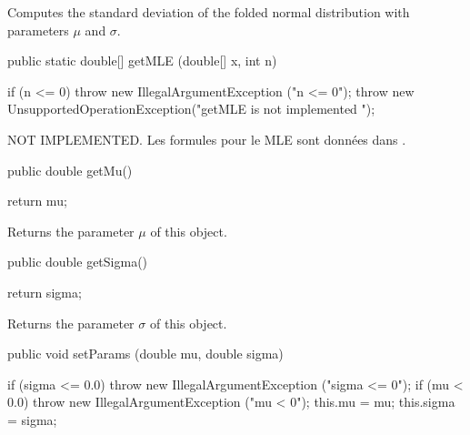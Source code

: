 \begin{tabb}  Computes the standard deviation of the folded normal distribution
with  parameters $\mu$ and $\sigma$.
\end{tabb}
\begin{htmlonly}
\end{htmlonly}
\begin{code}

   public static double[] getMLE (double[] x, int n)\begin{hide} {
      if (n <= 0)
         throw new IllegalArgumentException ("n <= 0");
      throw new UnsupportedOperationException("getMLE is not implemented ");
   }\end{hide}
\end{code}
\begin{tabb}
NOT IMPLEMENTED.  Les formules pour le MLE sont donn\'ees dans \cite{tLEO61a}.
\end{tabb}
\begin{htmlonly}
\end{htmlonly}
\begin{code}

   public double getMu()\begin{hide} {
      return mu;
   }\end{hide}
\end{code}
  \begin{tabb} Returns the parameter $\mu$ of this object.
  \end{tabb}
\begin{htmlonly}
\end{htmlonly}
\begin{code}

   public double getSigma()\begin{hide} {
      return sigma;
   }\end{hide}
\end{code}
  \begin{tabb} Returns the parameter $\sigma$ of this object.
  \end{tabb}
\begin{htmlonly}
\end{htmlonly}
\begin{code}

   public void setParams (double mu, double sigma) \begin{hide} {
      if (sigma <= 0.0)
         throw new IllegalArgumentException ("sigma <= 0");
      if (mu < 0.0)
         throw new IllegalArgumentException ("mu < 0");
      this.mu = mu;
      this.sigma = sigma;
    } \end{hide}
\end{code}
